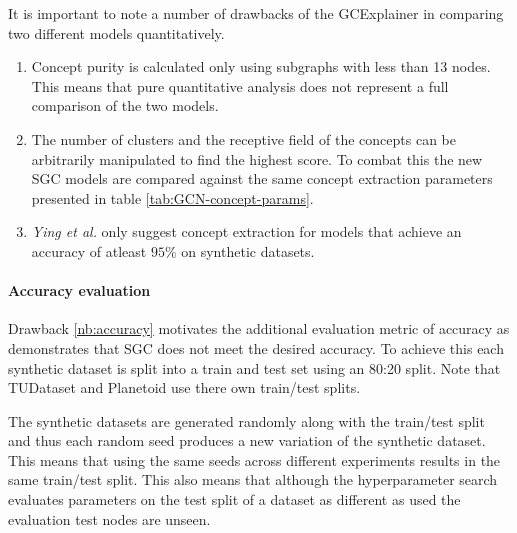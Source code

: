 It is important to note a number of drawbacks of the GCExplainer in comparing two different models quantitatively.
\begin{enumerate}
    \item 
        Concept purity is calculated only using subgraphs with less than 13 nodes.
        This means that pure quantitative analysis does not represent a full comparison of the two models.
    \item 
        The number of clusters and the receptive field of the concepts can be arbitrarily manipulated to find the highest score.
        To combat this the new SGC models are compared against the same concept extraction parameters presented in table \ref{tab:GCN-concept-params}.
    \item 
        \label{nb:accuracy}
        \textit{Ying et al.}\cite{ying2019gnnexplainer} only suggest concept extraction for models that achieve an accuracy of atleast $95\%$ on synthetic datasets. 
\end{enumerate}


\paragraph{Accuracy evaluation}
Drawback \ref{nb:accuracy} motivates the additional evaluation metric of accuracy as  demonstrates that SGC does not meet the desired accuracy.
To achieve this each synthetic dataset is split into a train and test set using an 80:20 split.
Note that TUDataset\cite{Morris+2020} and Planetoid\cite{kipf2016semi} use there own train/test splits.

The synthetic datasets are generated randomly along with the train/test split and thus each random seed produces a new variation of the synthetic dataset.
This means that using the same seeds across different experiments results in the same train/test split.
This also means that although the hyperparameter search evaluates parameters on the test split of a dataset as different as used the evaluation test nodes are unseen.

